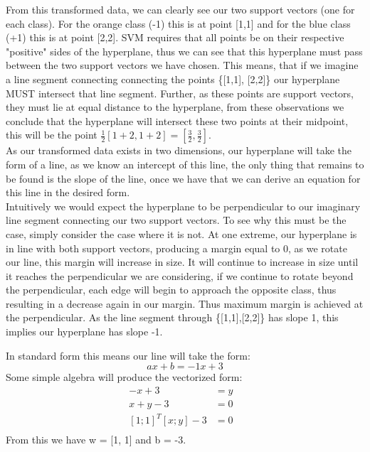 \documentclass{jhwhw}
\begin{document}
    From this transformed data, we can clearly see our two support vectors (one for each class).
    For the orange class (-1) this is at point [1,1] and for the blue class (+1) this is at point [2,2].
    SVM requires that all points be on their respective "positive" sides of the hyperplane, thus we can
    see that this hyperplane must pass between the two support vectors we have chosen.
    This means, that if we imagine a line segment connecting connecting the points \{[1,1], [2,2]\} our
    hyperplane MUST intersect that line segment. Further, as these points are support vectors, they must lie
    at equal distance to the hyperplane, from these observations we conclude that the hyperplane will intersect
    these two points at their midpoint, this will be the point $\frac{1}{2}[1 + 2, 1 + 2] = [\frac{3}{2}, \frac{3}{2}]$. \\

    As our transformed data exists in two dimensions, our hyperplane will take the form of a line, as we know an
    intercept of this line, the only thing that remains to be found is the slope of the line, once we have that we can
    derive an equation for this line in the desired form. \\

    Intuitively we would expect the hyperplane to be perpendicular to our imaginary line segment connecting our
    two support vectors. To see why this must be the case, simply consider the case where it is not.
    At one extreme, our hyperplane is in line with both support vectors, producing a margin equal to 0, as we rotate 
    our line, this margin will increase in size. It will continue to increase in size until it reaches the perpendicular
    we are considering, if we continue to rotate beyond the perpendicular, each edge will begin to approach
    the opposite class, thus resulting in a decrease again in our margin. Thus maximum margin is achieved at the 
    perpendicular. As the line segment through \{[1,1],[2,2]\} has slope 1, this implies our hyperplane has slope -1.

    In standard form this means our line will take the form: \\
    $$
	ax + b = -1x + 3
    $$
    Some simple algebra will produce the vectorized form: \\
    \begin{align*}
	-x + 3 &= y &\\
	x + y - 3 &= 0&\\
	[1; 1]^T[x; y] - 3 &= 0 &\\
    \end{align*}
    From this we have w = [1, 1] and b = -3. \\
\end{document}
